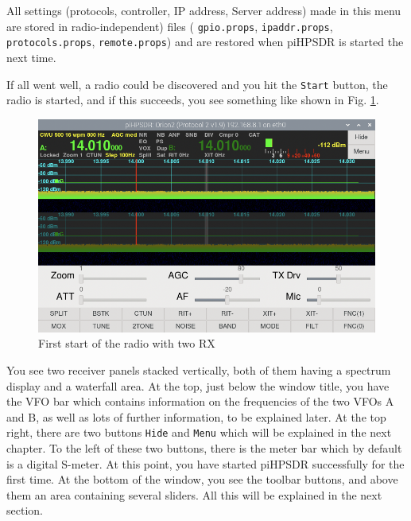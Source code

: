 \documentclass[12pt]{book}
\def\rett#1{\texttt{\color{red}#1}}
\def\pH{pi\-HPSDR\xspace}
\begin{document}
All settings (protocols, controller, IP address, Server address) made in this menu are stored in
radio-independent) files ( \texttt{gpio.props}, \texttt{ipaddr.props}, \texttt{protocols.props},
\texttt{remote.props})
and are restored when \pH is started the next time.

If all went well, a radio could be discovered and you hit the \rett{Start} button, the radio is started, and
if this succeeds, you see something like shown in Fig. \ref{fig:FirstDisplay}.

\begin{figure}
\center
\includegraphics[scale=0.45]{FirstDisplay.png}
\caption{First start of the radio with two RX}
\label{fig:FirstDisplay}
\end{figure}

You see two receiver panels stacked vertically, both of them having a spectrum display and a waterfall area.
At the top,
just below the window title, you have the VFO bar which contains information on the frequencies of the two
VFOs A and B,
as well as lots of further information, to be explained later. At the top right, there are two buttons
\rett{Hide}
and \rett{Menu} which will be explained in the next chapter. To the left of these two buttons, there is the
meter bar which by default is a digital S-meter. At this point, you have started \pH successfully for
the first time. At the bottom of the window, you see the toolbar buttons, and above them
an area containing several sliders. All this will be explained in the next section.

\end{document}
